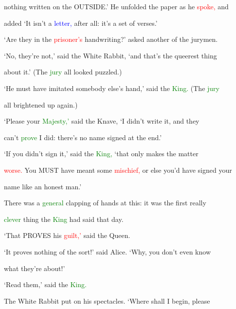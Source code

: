  nothing written on the OUTSIDE.’ He unfolded the paper as he \textcolor{red}{spoke,} and

 added ‘It isn’t a \textcolor{blue}{letter,} after all: it’s a set of verses.’



 ‘Are they in the \textcolor{red}{prisoner’s} handwriting?’ asked another of the jurymen.



 ‘No, they’re not,’ said the \textcolor{BurntOrange}{White} Rabbit, ‘and that’s the queerest thing

 about it.’ (The \textcolor{green}{jury} all looked puzzled.)



 ‘He must have imitated somebody else’s hand,’ said the \textcolor{green}{King.} (The \textcolor{green}{jury}

 all \textcolor{BurntOrange}{brightened} up again.)



 ‘Please your \textcolor{green}{Majesty,’} said the Knave, ‘I didn’t write it, and they

 can’t \textcolor{green}{prove} I did: there’s no name signed at the end.’



 ‘If you didn’t sign it,’ said the \textcolor{green}{King,} ‘that only makes the matter

 \textcolor{red}{worse.} You MUST have meant some \textcolor{red}{mischief,} or else you’d have signed your

 name like an \textcolor{BurntOrange}{honest} man.’



 There was a \textcolor{green}{general} \textcolor{BurntOrange}{clapping} of hands at this: it was the first really

 \textcolor{green}{clever} thing the \textcolor{green}{King} had said that day.



 ‘That PROVES his \textcolor{red}{guilt,’} said the Queen.



 ‘It proves nothing of the sort!’ said Alice. ‘Why, you don’t even know

 what they’re about!’



 ‘Read them,’ said the \textcolor{green}{King.}



 The \textcolor{BurntOrange}{White} Rabbit put on his \textcolor{BurntOrange}{spectacles.} ‘Where shall I begin, please


